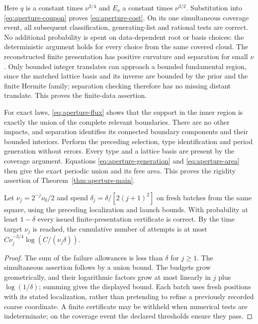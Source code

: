 Here $q$ is a constant times $\nu^{3/4}$ and $E_\nu$ a constant times
$\nu^{3/2}$. Substitution into \eqref{eq:aperture-coupon} proves
\eqref{eq:aperture-cost}. On its one simultaneous coverage event, all
subsequent classification, generating-list and rational tests are
correct. No additional probability is spent on data-dependent root or
basis choices: the deterministic argument holds for every choice from
the same covered cloud. The reconstructed finite presentation has
positive curvature and separation for small $\nu$. Only bounded integer
translates can approach a bounded fundamental region, since the matched
lattice basis and its inverse are bounded by the prior and the finite
Hermite family; separation checking therefore has no missing distant
translate. This proves the finite-data assertion.

For exact laws, \eqref{eq:aperture-flux} shows that the support in the
inner region is exactly the union of the complete relevant boundaries.
There are no other impacts, and separation identifies its connected
boundary components and their bounded interiors. Perform the preceding
selection, type identification and period generation without errors.
Every type and a lattice basis are present by the coverage argument.
Equations \eqref{eq:aperture-generation} and
\eqref{eq:aperture-area} then give the exact periodic union and its free
area. This proves the rigidity assertion of
Theorem~\ref{thm:aperture-main}.

\begin{corollary}
\label{cor:aperture-anytime}
Let $\nu_j=2^{-j}\nu_0/2$ and spend
$\delta_j=\delta/[2(j+1)^2]$ on fresh batches from the same square,
using the preceding localization and launch bounds. With probability
at least $1-\delta$ every issued finite-presentation certificate is
correct. By the time target $\nu_j$ is reached, the cumulative number
of attempts is at most $C\nu_j^{-3/4}\log(C/(\nu_j\delta))$.
\end{corollary}
\begin{proof}
The sum of the failure allowances is less than $\delta$ for $j\ge1$.
The simultaneous assertion follows by a union bound. The budgets grow
geometrically, and their logarithmic factors grow at most linearly in
$j$ plus $\log(1/\delta)$; summing gives the displayed bound. Each
batch uses fresh positions with its stated localization, rather than
pretending to refine a previously recorded coarse coordinate. A finite
certificate may be withheld when numerical tests are indeterminate;
on the coverage event the declared thresholds ensure they pass.
\end{proof}


